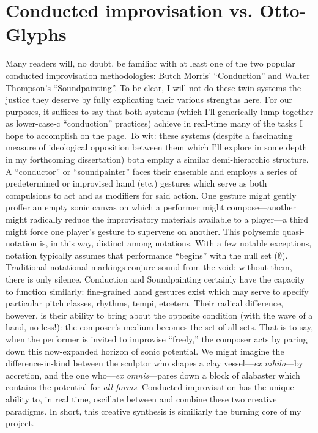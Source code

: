 \documentclass[twoside, 11pt]{book}
\begin{document}
        \section{Conducted improvisation vs. Otto-Glyphs}

        Many readers will, no doubt, be familiar with at least one of the two popular conducted improvisation methodologies: Butch Morris' ``Conduction'' and Walter Thompson's ``Soundpainting''. To be clear, I will not do these twin systems the justice they deserve by fully explicating their various strengths here. For our purposes, it suffices to say that both systems (which I'll generically lump together as lower-case-c ``conduction'' practices) achieve in real-time many of the tasks I hope to accomplish on the page. To wit: these systems (despite a fascinating measure of ideological opposition between them which I'll explore in some depth in my forthcoming dissertation) both employ a similar demi-hierarchic structure. A ``conductor'' or ``soundpainter'' faces their ensemble and employs a series of predetermined or improvised hand (etc.) gestures which serve as both compulsions to act and as modifiers for said action. One gesture might gently proffer an empty sonic canvas on which a performer might compose---another might radically reduce the improvisatory materials available to a player---a third might force one player's gesture to supervene on another. This polysemic quasi-notation is, in this way, distinct among notations. With a few notable exceptions, notation typically assumes that performance ``begins'' with the null set ($\emptyset$). Traditional notational markings conjure sound from the void; without them, there is only silence. Conduction and Soundpainting certainly have the capacity to function similarly: fine-grained hand gestures exist which may serve to specify particular pitch classes, rhythms, tempi, etcetera. Their radical difference, however, is their ability to bring about the opposite condition (with the wave of a hand, no less!): the composer's medium becomes the set-of-all-sets. That is to say, when the performer is invited to improvise ``freely,'' the composer acts by paring down this now-expanded horizon of sonic potential. We might imagine the difference-in-kind between the sculptor who shapes a clay vessel---\textit{ex nihilo}---by accretion, and the one who---\textit{ex omnis}---pares down a block of alabaster which contains the potential for \textit{all forms}. Conducted improvisation has the unique ability to, in real time, oscillate between and combine these two creative paradigms. In short, this creative synthesis is similiarly the burning core of my project.
\end{document}
